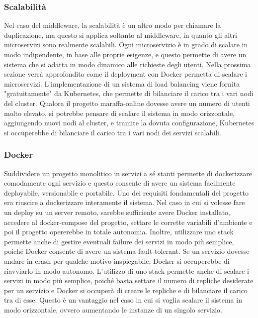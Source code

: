\subsubsection{Scalabilità}

Nel caso del middleware, la scalabilità è un altro modo per chiamare la duplicazione, ma questo si applica soltanto al middleware, in quanto gli altri microservizi sono realmente scalabili.
Ogni microservizio è in grado di scalare in modo indipendente, in base alle proprie esigenze, e questo permette di avere un sistema che si adatta in modo dinamico alle richieste degli utenti. 
Nella prossima sezione verrà approfondito come il deployment con Docker permetta di scalare i microservizi. L'implementazione di un sistema di load balancing viene fornita
"gratuitamente" da Kubernetes, che permette di bilanciare il carico tra i vari nodi del cluster. 
Qualora il progetto maraffa-online dovesse avere un numero di utenti molto elevato, si potrebbe pensare di scalare il sistema in modo orizzontale, aggiungendo nuovi nodi al cluster, 
e tramite la dovuta configurazione, Kubernetes si occuperebbe di bilanciare il carico tra i vari nodi dei servizi scalabili. 


\subsubsection{Docker}

Suddividere un progetto monolitico in servizi a sé stanti permette di dockerizzare comodamente ogni servizio e questo consente di avere un sistema facilmente deployabile, versionabile e portabile.
Uno dei requisiti fondamentali del progetto era riuscire a dockerizzare interamente il sistema. Nel caso in cui si volesse fare un deploy su un server remoto, sarebbe sufficiente avere Docker installato, accedere al docker-compose del progetto, settare le corrette variabili d'ambiente e poi il progetto opererebbe in totale autonomia.
Inoltre, utilizzare uno stack permette anche di gestire eventuali failure dei servizi in modo più semplice, poiché Docker consente di avere un sistema fault-tolerant. Se un servizio dovesse andare in crash per qualche motivo inspiegabile, Docker si occuperebbe di riavviarlo in modo autonomo.
L'utilizzo di uno stack permette anche di scalare i servizi in modo più semplice, poiché basta settare il numero di repliche desiderate per un servizio e Docker si occuperà di creare le repliche e di bilanciare il carico tra di esse. Questo è un vantaggio nel caso in cui si voglia scalare il sistema in modo orizzontale, ovvero aumentando le instanze di un singolo servizio.


